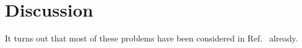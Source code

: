 \section{Discussion}
\label{sec:discussion}



It turns out that most of these problems have been considered in Ref.~\cite{walstrom_2017} already.

